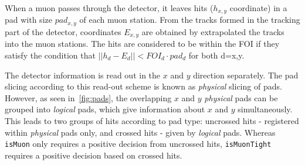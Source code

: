 When a muon passes through the detector, it leaves hits ($h_{x,y}$ coordinate) in a pad with size $pad_{x,y}$ of each muon station. From the tracks formed in the tracking part of the detector, coordinates $E_{x,y}$ are obtained by extrapolated the tracks into the muon stations. The hits are considered to be within the \gls{FOI} if they satisfy the condition that $|| h_{d} - E_{d} || < FOI_{d} \cdot pad_{d}$ for both d={x,y}. 

\color{black}

The detector information is read out in the $x$ and $y$ direction separately. The pad slicing according to this read-out scheme is known as \textit{physical} slicing of pads. However, as seen in~\autoref{fig:pads}, the overlapping $x$ and $y$ \textit{physical} pads can be grouped into \textit{logical} pads, which give information about $x$ and $y$ simultaneously. This leads to two groups of hits according to pad type: uncrossed hits - registered within \textit{physical} pads only, and crossed hits - given by \textit{logical} pads. Whereas \texttt{isMuon} only requires a positive decision from uncrossed hits, \texttt{isMuonTight} requires a positive decision based on crossed hits. 


